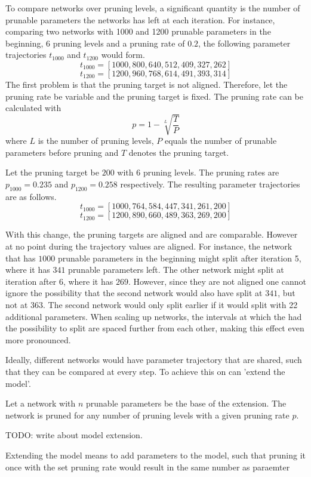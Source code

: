 To compare networks over pruning levels, a significant quantity is the number of prunable parameters the networks has left at each iteration.
For instance, comparing two networks with 1000 and 1200 prunable parameters in the beginning, 6 pruning levels and a pruning rate of $0.2$, the following parameter trajectories $t_{1000}$ and $t_{1200}$ would form.
$$
t_{1000} = [1000, 800, 640, 512, 409, 327, 262]
$$
$$
t_{1200} = [1200, 960, 768, 614, 491, 393, 314]
$$
The first problem is that the pruning target is not aligned.
Therefore, let the pruning rate be variable and the pruning target is fixed.
The pruning rate can be calculated with 
$$
p = 1 - \sqrt[L]{\frac{T}{P}}
$$
where $L$ is the number of pruning levels, $P$ equals the number of prunable parameters before pruning and $T$ denotes the pruning target.

Let the pruning target be $200$ with 6 pruning levels.
The pruning rates are $p_{1000} = 0.235$ and $p_{1200} = 0.258$ respectively.
The resulting parameter trajectories are as follows.
$$
t_{1000} = [1000, 764, 584, 447, 341, 261, 200]
$$
$$
t_{1200} = [1200, 890, 660, 489, 363, 269, 200]
$$

With this change, the pruning targets are aligned and are comparable.
However at no point during the trajectory values are aligned.
For instance, the network that has $1000$ prunable parameters in the beginning might split after iteration 5, where it has $341$ prunable parameters left. 
The other network might split at iteration after 6, where it has $269$.
However, since they are not aligned one cannot ignore the possibility that the second network would also have split at $341$, but not at $363$. 
The second network would only split earlier if it would split with 22 additional parameters.
When scaling up networks, the intervals at which the had the possibility to split are spaced further from each other, making this effect even more pronounced.

Ideally, different networks would have parameter trajectory that are shared, such that they can be compared at every step.
To achieve this on can 'extend the model'.

Let a network with $n$ prunable parameters be the base of the extension.
The network is pruned for any number of pruning levels with a given pruning rate $p$.

TODO: write about model extension.

Extending the model means to add parameters to the model, such that pruning it once with the set pruning rate would result in the same number as paraemter